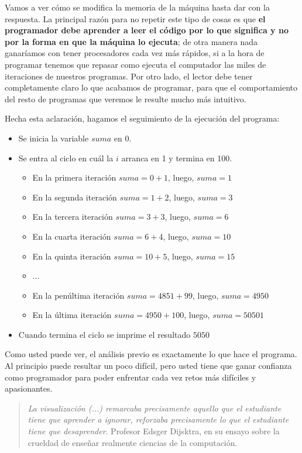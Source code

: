 Vamos a ver cómo se modifica la memoria de la máquina hasta dar con la respuesta. La principal razón para no repetir este tipo de cosas es que \textbf{el programador debe aprender a leer el código por lo que significa y no por la forma en que la máquina lo ejecuta}; de otra manera nada ganaríamos con tener procesadores cada vez más rápidos, si a la hora de programar tenemos que repasar como ejecuta el computador las miles de iteraciones de nuestros programas. Por otro lado, el lector debe tener completamente claro lo que acabamos de programar, para que el comportamiento del resto de programas que veremos le resulte mucho más intuitivo.

Hecha esta aclaración, hagamos el seguimiento de la ejecución del programa:

\begin{itemize}
\item Se inicia la variable $suma$ en 0.
\item Se entra al ciclo en cuál la $i$ arranca en 1 y termina en 100.
	\begin{itemize}
	\item En la primera iteración $suma=0+1$, luego, $suma = 1$
	\item En la segunda iteración $suma=1+2$, luego, $suma = 3$
	\item En la tercera iteración $suma=3+3$, luego, $suma = 6$
	\item En la cuarta iteración $suma=6+4$, luego, $suma = 10$
	\item En la quinta iteración $suma=10+5$, luego, $suma = 15$
	\item ...
	\item En la penúltima iteración $suma=4851+99$, luego, $suma = 4950$
	\item En la última iteración $suma=4950+100$, luego, $suma = 50501$
	\end{itemize}
\item Cuando termina el ciclo se imprime el resultado $5050$
\end{itemize}

Como usted puede ver, el análisis previo es exactamente lo que hace el programa. Al principio puede resultar un poco difícil, pero usted tiene que ganar confianza como programador para poder enfrentar cada vez retos más difíciles y apasionantes.

\begin{quote}
\emph{La visualización (...) remarcaba precisamente aquello que el estudiante tiene que aprender a ignorar, reforzaba precisamente lo que el estudiante tiene que desaprender}.
Profesor Edsger Dijsktra, en su ensayo sobre la crueldad de enseñar realmente ciencias de la computación.
\end{quote}

